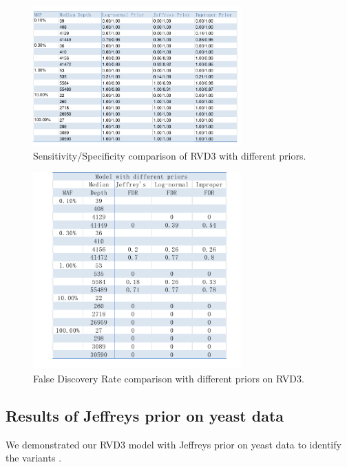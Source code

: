 \documentclass{bioinfo}
\begin{document}
\begin{figure}[htbp]
\begin{center}
\includegraphics[width=80mm]{tables/Sen_Speci.pdf}
\caption{Sensitivity/Specificity comparison of RVD3 with different priors.}
\label{fig:SS}
\end{center}
\end{figure}


\begin{figure}[htbp]
\begin{center}
\includegraphics[width=80mm]{tables/FDR.pdf}
\caption{False Discovery Rate comparison with different priors on RVD3.}
\label{fig:FDR}
\end{center}
\end{figure}

\subsection{Results of Jeffreys prior on yeast data}

We demonstrated our RVD3 model with Jeffreys prior on yeast data to identify the variants \citep{kvitek2013whole}.
\end{document}
